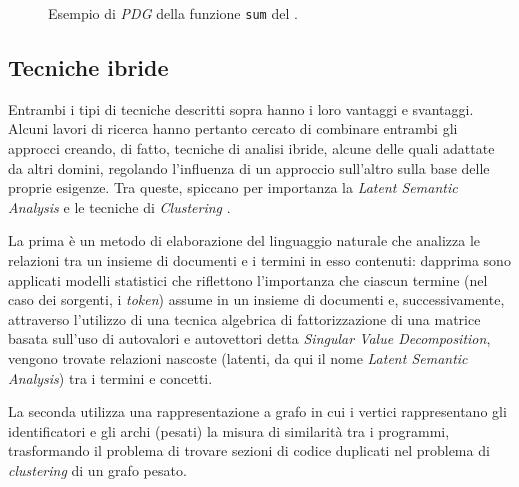 

\begin{figure}[h!]
    \caption{Esempio di \textit{PDG} della funzione \texttt{sum} del .}
    \label{img:01-pdg}
\end{figure}

\subsection{Tecniche ibride}
Entrambi i tipi di tecniche descritti sopra hanno i loro vantaggi e svantaggi. 
%
Alcuni lavori di ricerca hanno pertanto cercato di combinare entrambi gli approcci creando, di fatto, tecniche di analisi ibride, alcune delle quali adattate da altri domini, regolando l'influenza di un approccio sull'altro sulla base delle proprie esigenze.
%
Tra queste, spiccano per importanza la \textit{Latent Semantic Analysis} \cite{lsa} e le tecniche di \textit{Clustering} \cite{pdectet}.

La prima è un metodo di elaborazione del linguaggio naturale che analizza le relazioni tra un insieme di documenti e i termini in esso contenuti: dapprima sono applicati modelli statistici che riflettono l'importanza che ciascun termine (nel caso dei sorgenti, i \textit{token}) assume in un insieme di documenti e, successivamente, attraverso l'utilizzo di una tecnica algebrica di fattorizzazione di una matrice basata sull'uso di autovalori e autovettori detta \textit{Singular Value Decomposition}, vengono trovate relazioni nascoste (latenti, da qui il nome \textit{Latent Semantic Analysis}) tra i termini e concetti.

La seconda utilizza una rappresentazione a grafo in cui i vertici rappresentano gli identificatori e gli archi (pesati) la misura di similarità tra i programmi, trasformando il problema di trovare sezioni di codice duplicati nel problema di \textit{clustering} di un grafo pesato.

